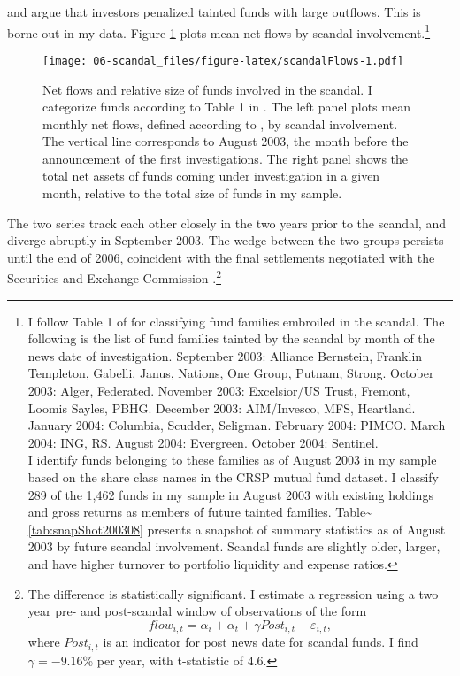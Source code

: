 \documentclass[openany]{book}
\let\rmarkdownfootnote\footnote%
\def\footnote{\protect\rmarkdownfootnote}
\theoremstyle{definition}
\theoremstyle{definition}
\theoremstyle{definition}
\theoremstyle{remark}
\begin{document}
\citet{hw05} and \citet{mccabe08} argue that investors penalized tainted
funds with large outflows. This is borne out in my data. Figure
\ref{fig:scandalFlows} plots mean net flows by scandal
involvement.\footnote{I follow Table 1 of \citet{hw05} for classifying
  fund families embroiled in the scandal. The following is the list of
  fund families tainted by the scandal by month of the news date of
  investigation. September 2003: Alliance Bernstein, Franklin Templeton,
  Gabelli, Janus, Nations, One Group, Putnam, Strong. October 2003:
  Alger, Federated. November 2003: Excelsior/US Trust, Fremont, Loomis
  Sayles, PBHG. December 2003: AIM/Invesco, MFS, Heartland. January
  2004: Columbia, Scudder, Seligman. February 2004: PIMCO. March 2004:
  ING, RS. August 2004: Evergreen. October 2004: Sentinel.\\
  I identify funds belonging to these families as of August 2003 in my
  sample based on the share class names in the CRSP mutual fund dataset.
  I classify 289 of the 1,462 funds in my sample in August 2003 with
  existing holdings and gross returns as members of future tainted
  families. Table\textasciitilde{}\ref{tab:snapShot200308} presents a
  snapshot of summary statistics as of August 2003 by future scandal
  involvement. Scandal funds are slightly older, larger, and have higher
  turnover to portfolio liquidity and expense ratios.}

\begin{figure}
\centering
\texttt{[image: 06-scandal\_files/figure-latex/scandalFlows-1.pdf]}
\caption{\label{fig:scandalFlows}Net flows and relative size of funds
involved in the scandal. I categorize funds according to Table 1 in
\citet{hw05}. The left panel plots mean monthly net flows, defined
according to \citet{st98}, by scandal involvement. The vertical line
corresponds to August 2003, the month before the announcement of the
first investigations. The right panel shows the total net assets of
funds coming under investigation in a given month, relative to the total
size of funds in my sample.}
\end{figure}

The two series track each other closely in the two years prior to the
scandal, and diverge abruptly in September 2003. The wedge between the
two groups persists until the end of 2006, coincident with the final
settlements negotiated with the Securities and Exchange Commission
\citep{zitzewitz09}.\footnote{The difference is statistically
  significant. I estimate a regression using a two year pre- and
  post-scandal window of observations of the form \[
  flow_{i,t}=\alpha_i + \alpha_t + \gamma Post_{i,t} +\varepsilon_{i,t},
  \] where \(Post_{i,t}\) is an indicator for post news date for scandal
  funds. I find \(\gamma=-9.16\)\% per year, with t-statistic of
  \(4.6\).}
\end{document}
